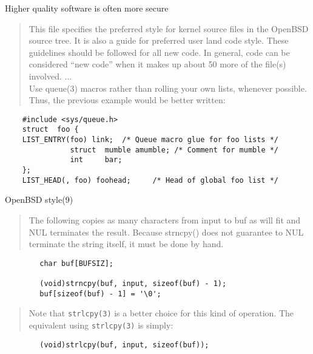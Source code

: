 \documentclass[Screen16to9,17pt]{foils}
\begin{document}


\centerline{Higher quality software is often more secure}


\begin{quote}
This file specifies the preferred style for kernel source files in the
OpenBSD source tree.  It is also a guide for preferred user land code
style.  These guidelines should be followed for all new code.  In general,
code can be considered ``new code'' when it makes up about 50%
more of the file(s) involved. ...\\
Use queue(3) macros rather than rolling your own lists, whenever possible.
Thus, the previous example would be better written:
\end{quote}

\begin{verbatim}
    #include <sys/queue.h>
    struct  foo {
    LIST_ENTRY(foo) link;  /* Queue macro glue for foo lists */
               struct  mumble amumble; /* Comment for mumble */
               int     bar;
    };
    LIST_HEAD(, foo) foohead;     /* Head of global foo list */
\end{verbatim}


OpenBSD style(9)


\begin{quote}
The following copies as many characters from input to buf as will fit and
NUL terminates the result.  Because strncpy() does not guarantee to NUL
terminate the string itself, it must be done by hand.
\end{quote}

\begin{verbatim}
        char buf[BUFSIZ];

        (void)strncpy(buf, input, sizeof(buf) - 1);
        buf[sizeof(buf) - 1] = '\0';
\end{verbatim}

\begin{quote}
Note that \verb+strlcpy(3)+ is a better choice for this kind of operation.  The
equivalent using \verb+strlcpy(3)+ is simply:
\end{quote}
\begin{verbatim}
        (void)strlcpy(buf, input, sizeof(buf));
\end{verbatim}
\end{document}
